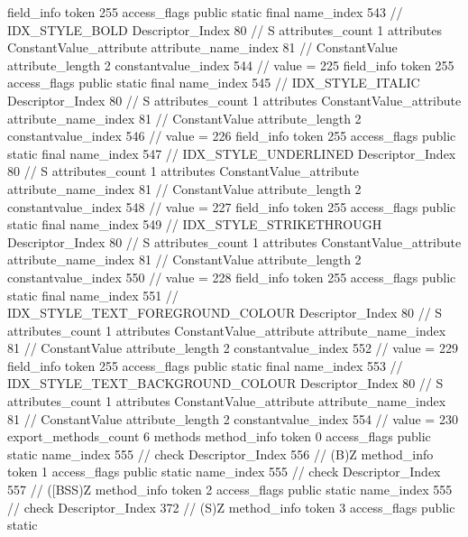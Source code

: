 {{{{{{{				}
				}
			}
			field_info {
				token	255
				access_flags	public static final
				name_index	543		// IDX_STYLE_BOLD
				Descriptor_Index	80		// S
				attributes_count	1
				attributes {
				ConstantValue_attribute {
					attribute_name_index	81		// ConstantValue
					attribute_length	2
					constantvalue_index	544		// value = 225
				}
				}
			}
			field_info {
				token	255
				access_flags	public static final
				name_index	545		// IDX_STYLE_ITALIC
				Descriptor_Index	80		// S
				attributes_count	1
				attributes {
				ConstantValue_attribute {
					attribute_name_index	81		// ConstantValue
					attribute_length	2
					constantvalue_index	546		// value = 226
				}
				}
			}
			field_info {
				token	255
				access_flags	public static final
				name_index	547		// IDX_STYLE_UNDERLINED
				Descriptor_Index	80		// S
				attributes_count	1
				attributes {
				ConstantValue_attribute {
					attribute_name_index	81		// ConstantValue
					attribute_length	2
					constantvalue_index	548		// value = 227
				}
				}
			}
			field_info {
				token	255
				access_flags	public static final
				name_index	549		// IDX_STYLE_STRIKETHROUGH
				Descriptor_Index	80		// S
				attributes_count	1
				attributes {
				ConstantValue_attribute {
					attribute_name_index	81		// ConstantValue
					attribute_length	2
					constantvalue_index	550		// value = 228
				}
				}
			}
			field_info {
				token	255
				access_flags	public static final
				name_index	551		// IDX_STYLE_TEXT_FOREGROUND_COLOUR
				Descriptor_Index	80		// S
				attributes_count	1
				attributes {
				ConstantValue_attribute {
					attribute_name_index	81		// ConstantValue
					attribute_length	2
					constantvalue_index	552		// value = 229
				}
				}
			}
			field_info {
				token	255
				access_flags	public static final
				name_index	553		// IDX_STYLE_TEXT_BACKGROUND_COLOUR
				Descriptor_Index	80		// S
				attributes_count	1
				attributes {
				ConstantValue_attribute {
					attribute_name_index	81		// ConstantValue
					attribute_length	2
					constantvalue_index	554		// value = 230
				}
				}
			}
			}
			export_methods_count	6
			methods {
				method_info {
					token	0
					access_flags	public static
					name_index	555		// check
					Descriptor_Index	556		// (B)Z
				}
				method_info {
					token	1
					access_flags	public static
					name_index	555		// check
					Descriptor_Index	557		// ([BSS)Z
				}
				method_info {
					token	2
					access_flags	public static
					name_index	555		// check
					Descriptor_Index	372		// (S)Z
				}
				method_info {
					token	3
					access_flags	public static
}}}}}
